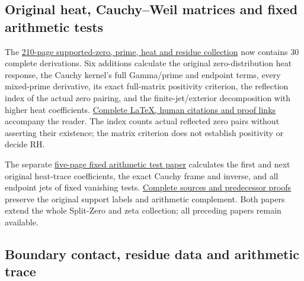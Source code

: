 \documentclass[
]{article}
\begin{document}
\subsection{Original heat, Cauchy--Weil matrices and fixed arithmetic
tests}\label{original-heat-cauchyweil-matrices-and-fixed-arithmetic-tests}

The
\href{https://github.com/KokunoYumeto/zeta-function-research-reader/blob/main/workbenches/splitzero-tandem/branches/tau-zero-prime-positivity/TAU_ZERO_PRIME_POSITIVITY.pdf}{210-page
supported-zero, prime, heat and residue collection} now contains 30
complete derivations. Six additions calculate the original
zero-distribution heat response, the Cauchy kernel's full Gamma/prime
and endpoint terms, every mixed-prime derivative, its exact full-matrix
positivity criterion, the reflection index of the actual zero pairing,
and the finite-jet/exterior decomposition with higher heat coefficients.
\href{https://github.com/KokunoYumeto/zeta-function-research-reader/blob/main/workbenches/splitzero-tandem/branches/tau-zero-prime-positivity/PUBLICATION_COMPANION.md}{Complete
LaTeX, human citations and proof links} accompany the reader. The index
counts actual reflected zero pairs without asserting their existence;
the matrix criterion does not establish positivity or decide RH.

The separate
\href{https://github.com/KokunoYumeto/zeta-function-research-reader/blob/main/workbenches/splitzero-tandem/continuations/20260923-fixed-arithmetic-heat-flags/FIXED_ARITHMETIC_HEAT_FLAGS.pdf}{five-page
fixed arithmetic test paper} calculates the first and next original
heat-trace coefficients, the exact Cauchy frame and inverse, and all
endpoint jets of fixed vanishing tests.
\href{https://github.com/KokunoYumeto/zeta-function-research-reader/blob/main/workbenches/splitzero-tandem/continuations/20260923-fixed-arithmetic-heat-flags/README.md}{Complete
sources and predecessor proofs} preserve the original support labels and
arithmetic complement. Both papers extend the whole Split-Zero and zeta
collection; all preceding papers remain available.

\subsection{Boundary contact, residue data and arithmetic
trace}\label{boundary-contact-residue-data-and-arithmetic-trace}
\end{document}
